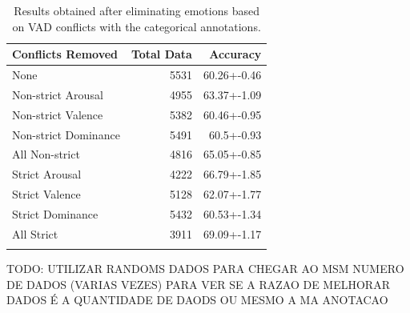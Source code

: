 \begin{table}[H]
\small
\caption{Results obtained after eliminating emotions based on VAD conflicts with the categorical annotations.}
\label{tab:dominance}
\centering
    \begin{tabular}{lrr}
        \toprule
        Conflicts Removed &    Total Data &  Accuracy  \\
        \midrule
        None & 5531 & 60.26+-0.46 \\         \addlinespace
        
        \hline
        \addlinespace
        
        Non-strict Arousal    &   4955 & 63.37+-1.09 \\         \addlinespace
        Non-strict Valence    &  5382 &  60.46+-0.95 \\   \addlinespace
        Non-strict Dominance   & 5491  & 60.5+-0.93 \\         \addlinespace
        All Non-strict  &  4816 & 65.05+-0.85 \\         \addlinespace
        
        \hline
        \addlinespace
        
        Strict Arousal    &  4222 & 66.79+-1.85 \\         \addlinespace
        Strict Valence    &  5128 &  62.07+-1.77 \\   \addlinespace
        Strict Dominance   & 5432  & 60.53+-1.34 \\         \addlinespace
        All Strict  &  3911 & 69.09+-1.17 \\         \addlinespace
        \bottomrule
    \end{tabular}
\end{table}

TODO: UTILIZAR RANDOMS DADOS PARA CHEGAR AO MSM NUMERO DE DADOS (VARIAS VEZES) PARA VER SE A RAZAO DE MELHORAR DADOS É A QUANTIDADE DE DAODS OU MESMO A MA ANOTACAO